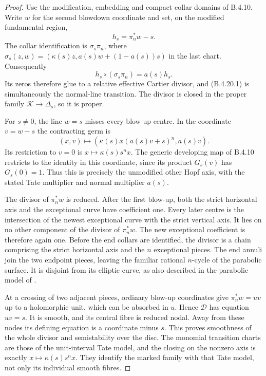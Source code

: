 \begin{proof}
Use the modification, embedding and compact collar
domains of B.4.10. Write $w$ for the second blowdown
coordinate and set, on the modified fundamental region,
\[
 h_s=\pi_n^*w-s.
\]
The collar identification is $\sigma_s\pi_n$, where
$\sigma_s(z,w)=(\kappa(s)z,a(s)w+(1-a(s))s)$ in
the last chart. Consequently
\[
 h_s\circ(\sigma_s\pi_n)=a(s)h_s.
 \tag{B.4.20.1}
\]
Its zeros therefore glue to a relative effective
Cartier divisor, and (B.4.20.1) is simultaneously the
normal-line transition. The divisor is closed in the
proper family $\mathcal K\to\Delta_s$, so it is proper.

For $s\ne0$, the line $w=s$ misses every blow-up centre.
In the coordinate $v=w-s$ the contracting germ is
\[
 (x,v)\longmapsto
       (\kappa(s)x(a(s)v+s)^n,a(s)v).
\]
Its restriction to $v=0$ is
$x\mapsto\kappa(s)s^n x$. The generic developing
map of B.4.10 restricts to the identity in this
coordinate, since its product $G_s(v)$ has
$G_s(0)=1$. Thus this is precisely the unmodified
other Hopf axis, with the stated Tate multiplier
and normal multiplier $a(s)$.

The divisor of $\pi_n^*w$ is reduced. After the first
blow-up, both the strict horizontal axis and the
exceptional curve have coefficient one. Every later
centre is the intersection of the newest exceptional
curve with the strict vertical axis. It lies on no
other component of the divisor of $\pi_n^*w$.
The new exceptional coefficient is therefore again
one. Before the end collars are identified, the
divisor is a chain comprising the strict horizontal
axis and the $n$ exceptional pieces. The end annuli
join the two endpoint pieces, leaving the familiar
rational $n$-cycle of the parabolic surface.
It is disjoint from its elliptic curve, as also
described in the parabolic model of
\cite[Example 9.10]{IstratiEtAl2022Root}.

At a crossing of two adjacent pieces, ordinary
blow-up coordinates give $\pi_n^*w=uv$ up to a
holomorphic unit, which can be absorbed in $u$.
Hence $\mathcal D$ has equation $uv=s$. It is
smooth, and its central fibre is reduced nodal.
Away from these nodes its defining equation is
a coordinate minus $s$. This proves smoothness
of the whole divisor and semistability over the disc.
The monomial transition charts are those of the
unit-interval Tate model, and the closing on the
nonzero axis is exactly $x\mapsto\kappa(s)s^n x$.
They identify the marked family with that Tate
model, not only its individual smooth fibres.


\end{proof}
